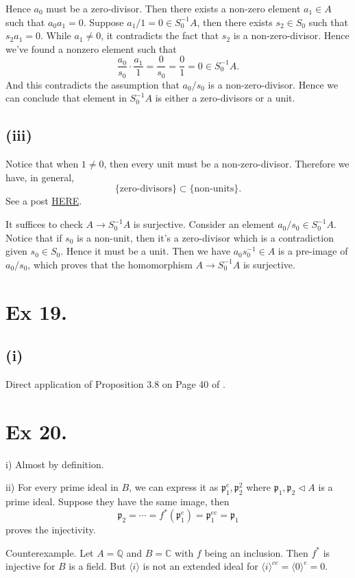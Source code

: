 Hence $a_0$ must be a zero-divisor. Then there exists a non-zero element $a_1\in A$ such that $a_0a_1=0$. Suppose $a_1/1=0\in S_0^{-1}A$, then there exists $s_2\in S_0$ such that $s_2a_1=0$. While $a_1\neq 0$, it contradicts the fact that $s_2$ is a non-zero-divisor. Hence we've found a nonzero element such that 
\[\frac{a_0}{s_0}\cdot \frac{a_1}{1}=\frac{0}{s_0}=\frac{0}{1}=0\in S_0^{-1}A.\]
And this contradicts the assumption that $a_0/s_0$ is a non-zero-divisor. Hence we can conclude that element in $S_0^{-1}A$ is either a zero-divisors or a unit.

\subsection{(iii)} %

Notice that when $1\neq 0$, then every unit must be a non-zero-divisor. Therefore we have, in general, \[\{\text{zero-divisors}\}\subset\{\text{non-units}\}.\]
See a post \href{https://math.stackexchange.com/questions/2062615/can-an-element-in-a-ring-with-unity-be-both-a-unit-and-zero-divisor}{HERE}.

It suffices to check $A\to S_0^{-1}A$ is surjective. Consider an element $a_0/s_0\in S_0^{-1}A$. Notice that if $s_0$ is a non-unit, then it's a zero-divisor which is a contradiction given $s_0\in S_0$. Hence it must be a unit. Then we have $a_0s_0^{-1}\in A$ is a pre-image of $a_0/s_0$, which proves that the homomorphism $A\to S_0^{-1}A$ is surjective. 

\section{Ex 19.}

\subsection{(i)} 
Direct application of Proposition 3.8 on Page 40 of \cite{atiyah1994introduction}. 

\section{Ex 20.}

i) Almost by definition.

ii) For every prime ideal in $B$, we can express it as $\mathfrak p_1^e,\mathfrak p_2^2$ where $\mathfrak p_1,\mathfrak p_2\triangleleft A$ is a prime ideal. Suppose they have the same image, then
\[\mathfrak p_2=\cdots=f^{\ast}(\mathfrak p_1^e)=\mathfrak p_1^{ec}=\mathfrak p_1\] proves the injectivity. 

Counterexample. Let $A=\mathbb Q$ and $B=\mathbb C$ with $f$ being an inclusion. Then $f^{\ast}$ is injective for $B$ is a field. But $\langle i\rangle$ is not an extended ideal for $\langle i\rangle^{ce}=\langle 0\rangle ^e=0$.